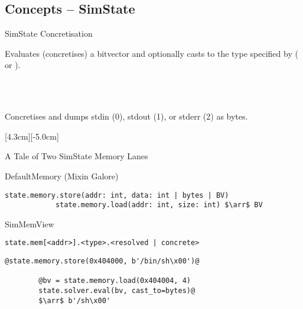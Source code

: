 \documentclass[xcolor={dvipsnames}]{beamer}
\begin{document}
\subsection{Concepts -- SimState}
\begin{frame}[fragile]{SimState Concretisation}
    \begin{block}{}
        Evaluates (concretises) a bitvector and optionally casts to the type specified by  ( or ).
    \end{block}
    \-\\
    \-\\
    \begin{block}{}
        Concretises and dumps stdin (0), stdout (1), or stderr (2) as bytes.
    \end{block}
    [4.3cm][-5.0cm]
\end{frame}
\begin{frame}[fragile]{{\small A Tale of Two} SimState Memory Lanes}
    \begin{block}{DefaultMemory (Mixin Galore)}
        \begin{lstlisting}[style=plain2,gobble=12]
            state.memory.store(addr: int, data: int | bytes | BV)
            state.memory.load(addr: int, size: int) $\arr$ BV
        \end{lstlisting}
    \end{block}
    \begin{block}{SimMemView}
        \begin{lstlisting}[style=plain2,gobble=12]
            state.mem[<addr>].<type>.<resolved | concrete>
        \end{lstlisting}
    \end{block}
\end{frame}
\begin{frame}[fragile]{}
    \begin{lstlisting}[style=hybrid2,gobble=8]
        @state.memory.store(0x404000, b'/bin/sh\x00')@

        @bv = state.memory.load(0x404004, 4)
        state.solver.eval(bv, cast_to=bytes)@
        $\arr$ b'/sh\x00'
    \end{lstlisting}
    \begin{center}
        
    \end{center}

\end{frame}
\end{document}
